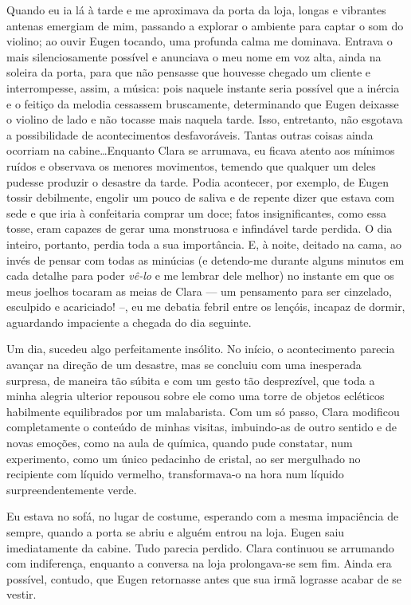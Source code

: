 Quando eu ia lá à tarde e me aproximava da porta da loja, longas e vibrantes antenas emergiam de mim, passando a explorar o ambiente para captar o som do violino; ao ouvir Eugen tocando, uma profunda calma me dominava. Entrava o mais silenciosamente possível e anunciava o meu nome em voz alta, ainda na soleira da porta, para que não pensasse que houvesse chegado um cliente e interrompesse, assim, a música: pois naquele instante seria possível que a inércia e o feitiço da melodia cessassem bruscamente, determinando que Eugen deixasse o violino de lado e não tocasse mais naquela tarde. Isso, entretanto, não esgotava a possibilidade de acontecimentos desfavoráveis. Tantas outras coisas ainda ocorriam na cabine\dots Enquanto Clara se arrumava, eu ficava atento aos mínimos ruídos e observava os menores movimentos, temendo que qualquer um deles pudesse produzir o desastre da tarde. Podia acontecer, por exemplo, de Eugen tossir debilmente, engolir um pouco de saliva e de repente dizer que estava com sede e que iria à confeitaria comprar um doce; fatos insignificantes, como essa tosse, eram capazes de gerar uma monstruosa e infindável tarde perdida. O dia inteiro, portanto, perdia toda a sua importância. E, à noite, deitado na cama, ao invés de pensar com todas as minúcias (e detendo-me durante alguns minutos em cada detalhe para poder \textit{vê-lo} e me lembrar dele melhor) no instante em que os meus joelhos tocaram as meias de Clara --- um pensamento para ser cinzelado, esculpido e acariciado! --, eu me debatia febril entre os lençóis, incapaz de dormir, aguardando impaciente a chegada do dia seguinte.

Um dia, sucedeu algo perfeitamente insólito. No início, o acontecimento parecia avançar na direção de um desastre, mas se concluiu com uma inesperada surpresa, de maneira tão súbita e com um gesto tão desprezível, que toda a minha alegria ulterior repousou sobre ele como uma torre de objetos ecléticos habilmente equilibrados por um malabarista.
Com um só passo, Clara modificou completamente o conteúdo de minhas visitas, imbuindo-as de outro sentido e de novas emoções, como na aula de química, quando pude constatar, num experimento, como um único pedacinho de cristal, ao ser mergulhado no recipiente com líquido vermelho, transformava-o na hora num líquido surpreendentemente verde.

Eu estava no sofá, no lugar de costume, esperando com a mesma impaciência de sempre, quando a porta se abriu e alguém entrou na loja. Eugen saiu imediatamente da cabine. Tudo parecia perdido. Clara continuou se arrumando com indiferença, enquanto a conversa na loja prolongava-se sem fim. Ainda era possível, contudo, que Eugen retornasse antes que sua irmã lograsse acabar de se vestir.

